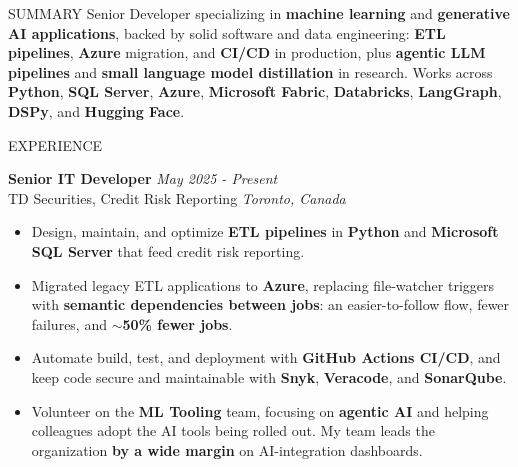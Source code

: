 \documentclass{resume}
\begin{document}
\begin{rSection}{SUMMARY}
Senior Developer specializing in \textbf{machine learning} and \textbf{generative AI applications}, backed by solid software and data engineering: \textbf{ETL pipelines}, \textbf{Azure} migration, and \textbf{CI/CD} in production, plus \textbf{agentic LLM pipelines} and \textbf{small language model distillation} in research. Works across \textbf{Python}, \textbf{SQL Server}, \textbf{Azure}, \textbf{Microsoft Fabric}, \textbf{Databricks}, \textbf{LangGraph}, \textbf{DSPy}, and \textbf{Hugging Face}.
\end{rSection}


\begin{rSection}{EXPERIENCE}

\textbf{Senior IT Developer} \hfill \textit{May 2025 - Present}\\
TD Securities, Credit Risk Reporting \hfill \textit{Toronto, Canada}
 \begin{itemize}
    \itemsep -3pt {}
    \item Design, maintain, and optimize \textbf{ETL pipelines} in \textbf{Python} and \textbf{Microsoft SQL Server} that feed credit risk reporting.
    \item Migrated legacy ETL applications to \textbf{Azure}, replacing file-watcher triggers with \textbf{semantic dependencies between jobs}: an easier-to-follow flow, fewer failures, and $\sim$\textbf{50\% fewer jobs}.
    \item Automate build, test, and deployment with \textbf{GitHub Actions CI/CD}, and keep code secure and maintainable with \textbf{Snyk}, \textbf{Veracode}, and \textbf{SonarQube}.
    \item Volunteer on the \textbf{ML Tooling} team, focusing on \textbf{agentic AI} and helping colleagues adopt the AI tools being rolled out. My team leads the organization \textbf{by a wide margin} on AI-integration dashboards.
 \end{itemize}


\end{rSection}
\end{document}

